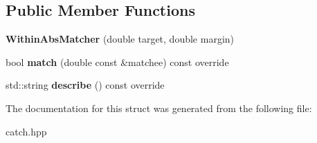 \subsection*{Public Member Functions}
\begin{DoxyCompactItemize}
\item 
{\bfseries Within\+Abs\+Matcher} (double target, double margin)\hypertarget{structCatch_1_1Matchers_1_1Floating_1_1WithinAbsMatcher_ac45340b98c41230a7def5bd86c2d870f}{}\label{structCatch_1_1Matchers_1_1Floating_1_1WithinAbsMatcher_ac45340b98c41230a7def5bd86c2d870f}

\item 
bool {\bfseries match} (double const \&matchee) const override\hypertarget{structCatch_1_1Matchers_1_1Floating_1_1WithinAbsMatcher_afa5d8eed57f12c1e5d006471eb0bfe72}{}\label{structCatch_1_1Matchers_1_1Floating_1_1WithinAbsMatcher_afa5d8eed57f12c1e5d006471eb0bfe72}

\item 
std\+::string {\bfseries describe} () const override\hypertarget{structCatch_1_1Matchers_1_1Floating_1_1WithinAbsMatcher_a206a738680f8767af31d3f1835afff3f}{}\label{structCatch_1_1Matchers_1_1Floating_1_1WithinAbsMatcher_a206a738680f8767af31d3f1835afff3f}

\end{DoxyCompactItemize}


The documentation for this struct was generated from the following file\+:\begin{DoxyCompactItemize}
\item 
catch.\+hpp\end{DoxyCompactItemize}
